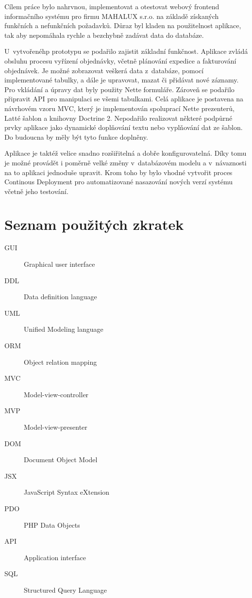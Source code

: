 \documentclass[thesis=B,czech]{FITthesis}[2012/06/26]
\begin{document}
\begin{conclusion}
	Cílem práce bylo nahrvnou, implementovat a otestovat webový frontend informačního systému pro firmu MAHALUX s.r.o. na základě získaných funkčních a nefunkčních požadavků. Důraz byl kladen na použitelnost aplikace, tak aby nepomáhala rychle a bezchybně zadávat data do databáze.
	
	U~vytvořenéhp prototypu se podařilo zajistit základní funkčnost. Aplikace zvládá obsluhu procesu vyřízení objednávky, včetně plánování expedice a fakturování objednávek. Je možné zobrazovat veškerá data z~databáze, pomocí implementované tabulky, a dále je upravovat, mazat či přidávat nové záznamy. Pro vkládání a úpravy dat byly použity Nette formuláře. Zároveň se podařilo připravit API pro manipulaci se všemi tabulkami. Celá aplikace je postavena na návrhovém vzoru MVC, který je implementován spoluprací Nette prezenterů, Latté šablon a knihovny Doctrine 2. Nepodařilo realizovat některé podpůrné prvky aplikace jako dynamické doplňování textu nebo vyplňování dat ze šablon. Do budoucna by měly být tyto funkce doplněny. 
	
	Aplikace je taktéž velice snadno rozšiřitelná a dobře konfigurovatelná. Díky tomu je možné provádět i poměrně velké změny v~databázovém modelu a v~návaznosti na to aplikaci jednoduše upravit. Krom toho by bylo vhodné vytvořit proces Continous Deployment pro automatizované nasazování nových verzí systému včetně jeho testování.
\end{conclusion}




\appendix

\chapter{Seznam použitých zkratek}
\begin{description}
	\item[GUI] Graphical user interface
	\item[DDL] Data definition language
	\item[UML] Unified Modeling language
	\item[ORM] Object relation mapping
	\item[MVC] Model-view-controller
	\item[MVP] Model-view-presenter
	\item[DOM] Document Object Model
	\item[JSX] JavaScript Syntax eXtension
	\item[PDO] PHP Data Objects
	\item[API] Application interface
	\item[SQL] Structured Query Language
\end{description}
\end{document}

